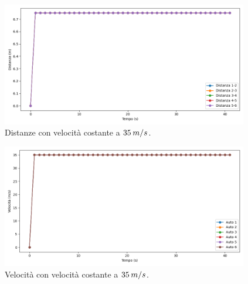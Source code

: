 \begin{figure}[H]
    \includegraphics[width=0.96\textwidth]{images/5-experiment/velocity/distance_35-35-35-35-35.png}
    \caption{Distanze con velocità costante a $35\hspace{0.2em}m/s$.}
    \label{fig:35-constvelocity-distance}
\end{figure}

\begin{figure}[H]
    \includegraphics[width=0.96\textwidth]{images/5-experiment/velocity/velocity_35-35-35-35-35.png}
    \caption{Velocità con velocità costante a $35\hspace{0.2em}m/s$.}
    \label{fig:35-constvelocity-velocity}
\end{figure}

\newpage

